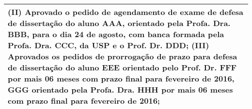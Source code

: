 \begin{longtable}{|p{17.5cm}|}
 \\ \hline 
(II) Aprovado o pedido de agendamento de exame de defesa de dissertação do aluno AAA, orientado pela Profa. Dra. BBB, para o dia 24 de agosto, com banca formada pela Profa. Dra. CCC, da USP e o Prof. Dr. DDD; (III) Aprovados os pedidos de prorrogação de prazo para defesa de dissertação do aluno EEE orientado pelo Prof. Dr. FFF por mais 06 meses com prazo final para fevereiro de 2016, GGG orientado pela Profa. Dra. HHH por mais 06 meses com prazo final para fevereiro de 2016;

 \\ \hline 

\end{longtable} 



